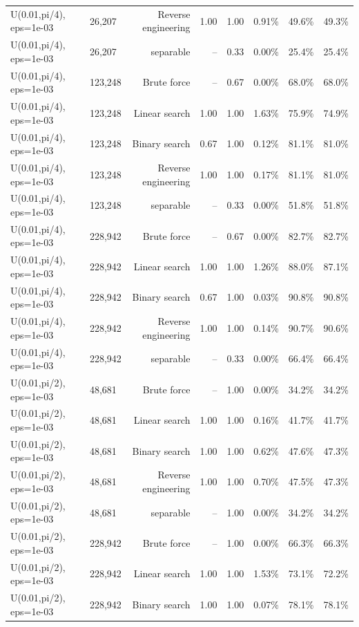 \begin{tabular}{llrrrrrr}
U(0.01,pi/4), eps=1e-03 & 26,207 & Reverse engineering & 1.00 & 1.00 & 0.91\% & 49.6\% & 49.3\% \\
U(0.01,pi/4), eps=1e-03 & 26,207 & separable & -- & 0.33 & 0.00\% & 25.4\% & 25.4\% \\
U(0.01,pi/4), eps=1e-03 & 123,248 & Brute force & -- & 0.67 & 0.00\% & 68.0\% & 68.0\% \\
U(0.01,pi/4), eps=1e-03 & 123,248 & Linear search & 1.00 & 1.00 & 1.63\% & 75.9\% & 74.9\% \\
U(0.01,pi/4), eps=1e-03 & 123,248 & Binary search & 0.67 & 1.00 & 0.12\% & 81.1\% & 81.0\% \\
U(0.01,pi/4), eps=1e-03 & 123,248 & Reverse engineering & 1.00 & 1.00 & 0.17\% & 81.1\% & 81.0\% \\
U(0.01,pi/4), eps=1e-03 & 123,248 & separable & -- & 0.33 & 0.00\% & 51.8\% & 51.8\% \\
U(0.01,pi/4), eps=1e-03 & 228,942 & Brute force & -- & 0.67 & 0.00\% & 82.7\% & 82.7\% \\
U(0.01,pi/4), eps=1e-03 & 228,942 & Linear search & 1.00 & 1.00 & 1.26\% & 88.0\% & 87.1\% \\
U(0.01,pi/4), eps=1e-03 & 228,942 & Binary search & 0.67 & 1.00 & 0.03\% & 90.8\% & 90.8\% \\
U(0.01,pi/4), eps=1e-03 & 228,942 & Reverse engineering & 1.00 & 1.00 & 0.14\% & 90.7\% & 90.6\% \\
U(0.01,pi/4), eps=1e-03 & 228,942 & separable & -- & 0.33 & 0.00\% & 66.4\% & 66.4\% \\
U(0.01,pi/2), eps=1e-03 & 48,681 & Brute force & -- & 1.00 & 0.00\% & 34.2\% & 34.2\% \\
U(0.01,pi/2), eps=1e-03 & 48,681 & Linear search & 1.00 & 1.00 & 0.16\% & 41.7\% & 41.7\% \\
U(0.01,pi/2), eps=1e-03 & 48,681 & Binary search & 1.00 & 1.00 & 0.62\% & 47.6\% & 47.3\% \\
U(0.01,pi/2), eps=1e-03 & 48,681 & Reverse engineering & 1.00 & 1.00 & 0.70\% & 47.5\% & 47.3\% \\
U(0.01,pi/2), eps=1e-03 & 48,681 & separable & -- & 1.00 & 0.00\% & 34.2\% & 34.2\% \\
U(0.01,pi/2), eps=1e-03 & 228,942 & Brute force & -- & 1.00 & 0.00\% & 66.3\% & 66.3\% \\
U(0.01,pi/2), eps=1e-03 & 228,942 & Linear search & 1.00 & 1.00 & 1.53\% & 73.1\% & 72.2\% \\
U(0.01,pi/2), eps=1e-03 & 228,942 & Binary search & 1.00 & 1.00 & 0.07\% & 78.1\% & 78.1\% \\

\end{tabular}
